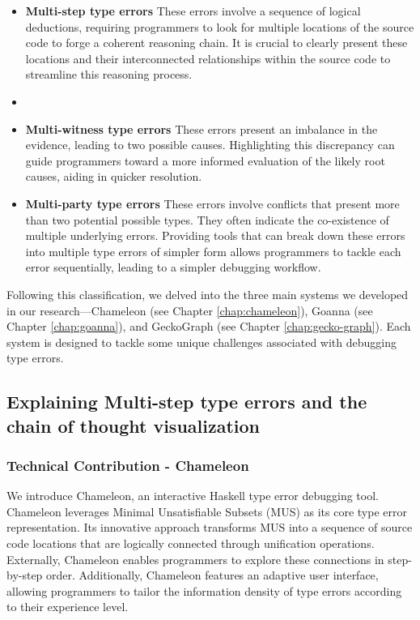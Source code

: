 \begin{itemize}
    \item {\textbf{Multi-step type errors} These errors involve a sequence of logical deductions, requiring programmers to look for multiple locations of the source code to forge a coherent reasoning chain. It is crucial to clearly present these locations and their interconnected relationships within the source code to streamline this reasoning process.}
    \item 
    \item{\textbf{Multi-witness type errors}  These errors present an imbalance in the evidence, leading to two possible causes. Highlighting this discrepancy can guide programmers toward a more informed evaluation of the likely root causes, aiding in quicker resolution.}
    \item{\textbf{Multi-party type errors} These errors involve conflicts that present more than two potential possible types. They often indicate the co-existence of multiple underlying errors. Providing tools that can break down these errors into multiple type errors of simpler form allows programmers to tackle each error sequentially, leading to a simpler debugging workflow.}
\end{itemize}


Following this classification, we delved into the three main systems we developed in our research—Chameleon (see Chapter \ref{chap:chameleon}), Goanna (see Chapter \ref{chap:goanna}), and GeckoGraph (see Chapter \ref{chap:gecko-graph}). Each system is designed to tackle some unique challenges associated with debugging type errors.

\subsection{Explaining Multi-step type errors and the chain of thought visualization}

\subsubsection{Technical Contribution - Chameleon}
We introduce Chameleon, an interactive Haskell type error debugging tool. Chameleon leverages Minimal Unsatisfiable Subsets (MUS) as its core type error representation. Its innovative approach transforms MUS into a sequence of source code locations that are logically connected through unification operations. Externally, Chameleon enables programmers to explore these connections in step-by-step order. Additionally, Chameleon features an adaptive user interface, allowing programmers to tailor the information density of type errors according to their experience level.


